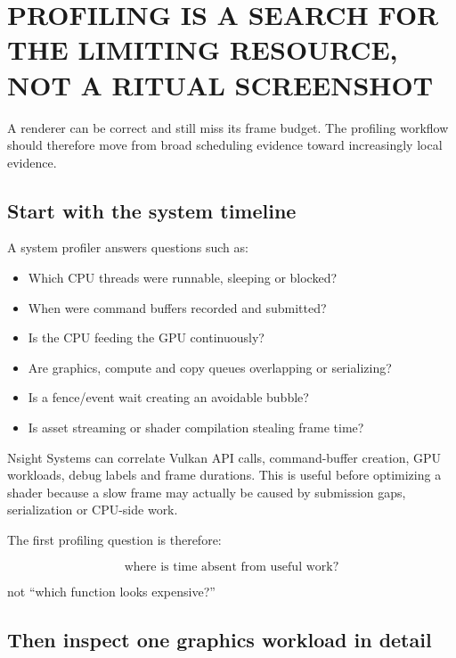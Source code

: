 \section{PROFILING IS A SEARCH FOR THE LIMITING RESOURCE, NOT A RITUAL SCREENSHOT}\label{05-engine-i-ch008-profiling-is-a-search-for-the-limiting-resource-not-a-ritual-screenshot}

\hypertarget{05-engine-i-ch008-profiling-is-a-search-for-the-limiting-resource-not-a-ritual-screenshot}{}

A renderer can be correct and still miss its frame budget. The profiling workflow should therefore move from broad scheduling evidence toward increasingly local evidence.

\subsection{Start with the system timeline}\label{05-engine-i-ch008-start-with-the-system-timeline}

\hypertarget{05-engine-i-ch008-start-with-the-system-timeline}{}

A system profiler answers questions such as:

\begin{itemize}
\tightlist
\item
  Which CPU threads were runnable, sleeping or blocked?
\item
  When were command buffers recorded and submitted?
\item
  Is the CPU feeding the GPU continuously?
\item
  Are graphics, compute and copy queues overlapping or serializing?
\item
  Is a fence/event wait creating an avoidable bubble?
\item
  Is asset streaming or shader compilation stealing frame time?
\end{itemize}

Nsight Systems can correlate Vulkan API calls, command-buffer creation, GPU workloads, debug labels and frame durations. This is useful before optimizing a shader because a slow frame may actually be caused by submission gaps, serialization or CPU-side work.

The first profiling question is therefore:

\[
\boxed{
\text{where is time absent from useful work?}
}
\]

not ``which function looks expensive?''

\subsection{Then inspect one graphics workload in detail}\label{05-engine-i-ch008-then-inspect-one-graphics-workload-in-detail}

